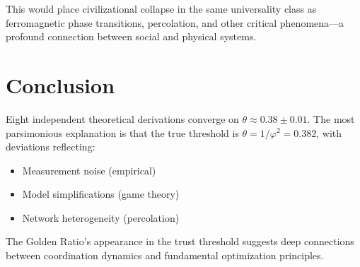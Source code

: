 \documentclass[11pt]{article}
\begin{document}
This would place civilizational collapse in the same universality class as ferromagnetic phase transitions, percolation, and other critical phenomena---a profound connection between social and physical systems.

\section{Conclusion}

Eight independent theoretical derivations converge on $\theta \approx 0.38 \pm 0.01$. The most parsimonious explanation is that the true threshold is $\theta = 1/\varphi^2 = 0.382$, with deviations reflecting:
\begin{itemize}
\item Measurement noise (empirical)
\item Model simplifications (game theory)
\item Network heterogeneity (percolation)
\end{itemize}

The Golden Ratio's appearance in the trust threshold suggests deep connections between coordination dynamics and fundamental optimization principles.
\end{document}
